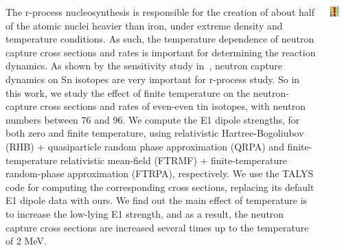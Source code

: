 \documentclass[25pt, a0paper, portrait]{tikzposter}
\begin{document}
\begin{columns}

    {The r-process nucleosynthesis is responsible for the creation of about half of
    the atomic nuclei heavier than iron, under extreme density and temperature
    conditions. As such, the temperature dependence of neutron capture cross
    sections and rates is important for determining the reaction dynamics. As shown
    by the sensitivity study in~\cite{Mumpower2016}, neutron capture dynamics
    on Sn isotopes are very important for r-process study.  So in this work, we
    study the effect of finite temperature on the neutron-capture cross sections and
    rates of even-even tin isotopes, with neutron numbers between 76 and 96.  We
    compute the E1 dipole strengths, for both zero and finite temperature, using
    relativistic Hartree-Bogoliubov (RHB) + quasiparticle random phase approximation
    (QRPA) and finite-temperature relativistic mean-field (FTRMF) +
    finite-temperature random-phase approximation (FTRPA), respectively. We use the
    TALYS code for computing the corresponding cross sections, replacing its default
    E1 dipole data with ours.  We find out the main effect of temperature is to
    increase the low-lying E1 strength, and as a result, the neutron capture cross
    sections are increased several times up to the temperature of 2 MeV.}


    {
        \begin{tikzfigure}
            \includegraphics[width=0.4\textwidth]{images/colormesh.pdf}
        \end{tikzfigure}
    }




\end{columns}
\end{document}
